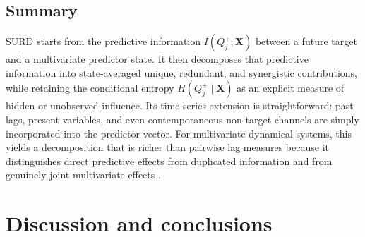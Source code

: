\documentclass[fleqn,usenatbib]{mnras}
\newcommand{\SURDResultsPath}{collaborator_rebuild/results_section}
\begin{document}
\subsection{Summary}

SURD starts from the predictive information \(I(Q_j^+;\mathbf{X})\) between a future target and a multivariate predictor state. It then decomposes that predictive information into state-averaged unique, redundant, and synergistic contributions, while retaining the conditional entropy \(H(Q_j^+\mid \mathbf{X})\) as an explicit measure of hidden or unobserved influence. Its time-series extension is straightforward: past lags, present variables, and even contemporaneous non-target channels are simply incorporated into the predictor vector. For multivariate dynamical systems, this yields a decomposition that is richer than pairwise lag measures because it distinguishes direct predictive effects from duplicated information and from genuinely joint multivariate effects \citep{MartinezSanchez2024SURD,WilliamsBeer2010}.

\fi



\section{Discussion and conclusions}
\label{sec:epoch_conclusions}
\end{document}
